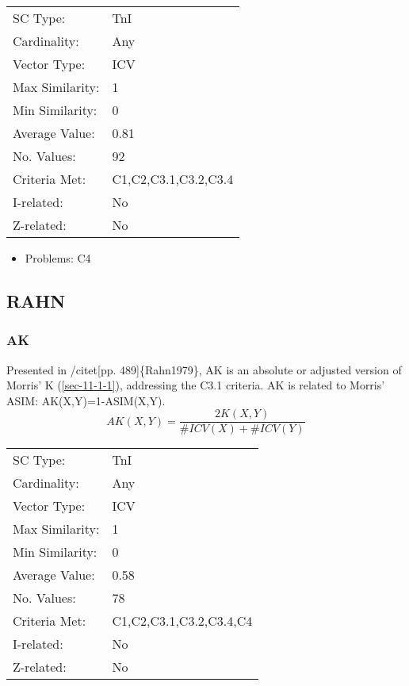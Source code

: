 \documentclass{article}
\begin{document}
\begin{center}
\begin{tabular}{ll}
 SC Type:         &  TnI                   \\
 Cardinality:     &  Any                   \\
 Vector Type:     &  ICV                   \\
 Max Similarity:  &  1                     \\
 Min Similarity:  &  0                     \\
 Average Value:   &  0.81                  \\
 No. Values:      &  92                    \\
 Criteria Met:    &  C1,C2,C3.1,C3.2,C3.4  \\
 I-related:       &  No                    \\
 Z-related:       &  No                    \\
\end{tabular}
\end{center}


\begin{itemize}
\item Problems: C4
\end{itemize}
\subsection{RAHN}
\label{sec-11-5}
\subsubsection{AK}
\label{sec-11-5-1}

Presented in /citet[pp. 489]\{Rahn1979\}, AK is an absolute or adjusted
version of Morris' K (\ref{sec-11-1-1}), addressing the C3.1 criteria. AK is related
to Morris' ASIM: AK(X,Y)=1-ASIM(X,Y).
$$AK\left(X,Y\right)=\frac{2K\left(X,Y\right)}{\#ICV\left(X\right)+\#ICV\left(Y\right)}$$

\begin{center}
\begin{tabular}{ll}
 SC Type:         &  TnI                      \\
 Cardinality:     &  Any                      \\
 Vector Type:     &  ICV                      \\
 Max Similarity:  &  1                        \\
 Min Similarity:  &  0                        \\
 Average Value:   &  0.58                     \\
 No. Values:      &  78                       \\
 Criteria Met:    &  C1,C2,C3.1,C3.2,C3.4,C4  \\
 I-related:       &  No                       \\
 Z-related:       &  No                       \\
\end{tabular}
\end{center}
\end{document}
